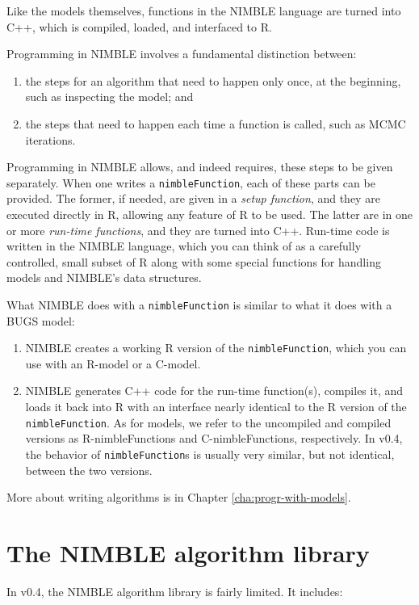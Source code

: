 \documentclass[12pt,oneside]{book}\usepackage[]{graphicx}\usepackage[]{color}
\def\cd#1{\texttt{#1}}
\def\nm#1{\textit{#1}}
\newcommand{\ver}{0.4}
\begin{document}
  Like the models themselves, functions in
  the NIMBLE language are turned into C++, which is compiled, loaded,
  and interfaced to R.  

Programming in NIMBLE involves a fundamental distinction between:
\begin{enumerate}
\item the steps for an algorithm that need to happen only
once, at the beginning, such as inspecting the model; and
\item the steps that need to happen each time a function is called, such as MCMC iterations.
\end{enumerate}
Programming in NIMBLE allows, and indeed requires, these steps to be
given separately.  When one writes a \cd{nimbleFunction}, each of
these parts can be provided.  The former, if needed, are given in a \nm{setup
  function}, and they are executed directly in R, allowing any feature
of R to be used.  The latter are in one or more \nm{run-time functions}, and they
are turned into C++.  Run-time code is written in the NIMBLE language,
which you can think of as a carefully controlled, small subset of R
along with some special functions for handling models and NIMBLE's
data structures.

What NIMBLE does with a \cd{nimbleFunction} is similar to what it does
with a BUGS model:
\begin{enumerate}
\item NIMBLE creates a working R version of the \cd{nimbleFunction},
  which you can use with an R-model or a C-model.
\item NIMBLE generates C++ code for the run-time function(s), compiles
  it, and loads it back into R with an interface nearly identical to
  the R version of the \cd{nimbleFunction}.   As for models, we refer
  to the uncompiled and compiled versions as R-nimbleFunctions and
  C-nimbleFunctions, respectively.   In v\ver, the behavior
  of \cd{nimbleFunction}s is usually very similar, but not identical,
  between the two versions.
\end{enumerate}

  More about writing algorithms is in Chapter \ref{cha:progr-with-models}.
  
\section{The NIMBLE algorithm library}
\label{sec:nimble-algor-libr}

In v\ver, the NIMBLE algorithm library is fairly limited.  It includes:
\end{document}
